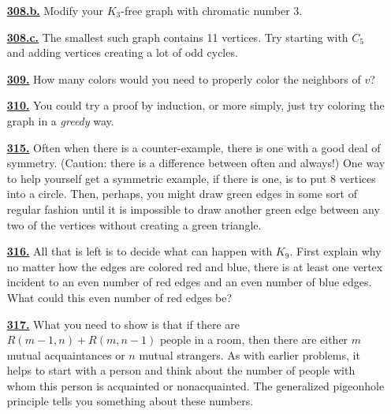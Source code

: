 \documentclass[10pt,]{book}
\theoremstyle{plain}
\theoremstyle{definition}
\theoremstyle{definition}
\theoremstyle{definition}
\numberwithin{equation}{chapter}
\begin{document}
\begin{itemize}[itemsep=1em]
\hypertarget{a-308.b}{}\item[\textbf{\hyperref[task-279]{308.b.}}]
\hypertarget{p-1638}{}%
Modify your \(K_3\)-free graph with chromatic number 3.%

\hypertarget{a-308.c}{}\item[\textbf{\hyperref[task-280]{308.c.}}]
\hypertarget{p-1641}{}%
The smallest such graph contains 11 vertices.  Try starting with \(C_5\) and adding vertices creating a lot of odd cycles.%

\hypertarget{a-309}{}\item[\textbf{\hyperref[activity-302]{309.}}]
\hypertarget{p-1648}{}%
How many colors would you need to properly color the neighbors of \(v\)?%

\hypertarget{a-310}{}\item[\textbf{\hyperref[activity-303]{310.}}]
\hypertarget{p-1651}{}%
You could try a proof by induction, or more simply, just try coloring the graph in a \emph{greedy} way.%

\hypertarget{a-315}{}\item[\textbf{\hyperref[activity-308]{315.}}]
\hypertarget{p-1675}{}%
Often when there is a counter-example, there is one with a good deal of symmetry. (Caution: there is a difference between often and always!) One way to help yourself get a symmetric example, if there is one, is to put 8 vertices into a circle. Then, perhaps, you might draw green edges in some sort of regular fashion until it is impossible to draw another green edge between any two of the vertices without creating a green triangle.%

\hypertarget{a-316}{}\item[\textbf{\hyperref[activity-309]{316.}}]
\hypertarget{p-1677}{}%
All that is left is to decide what can happen with \(K_9\).  First explain why no matter how the edges are colored red and blue, there is at least one vertex incident to an even number of red edges and an even number of blue edges.  What could this even number of red edges be?%

\hypertarget{a-317}{}\item[\textbf{\hyperref[Ramseyrecurrence]{317.}}]
\hypertarget{p-1681}{}%
What you need to show is that if there are \(R(m - 1, n) + R(m, n - 1)\) people in a room, then there are either \(m\) mutual acquaintances or \(n\) mutual strangers. As with earlier problems, it helps to start with a person and think about the number of people with whom this person is acquainted or nonacquainted. The generalized pigeonhole principle tells you something about these numbers.%


\end{itemize}
\end{document}
